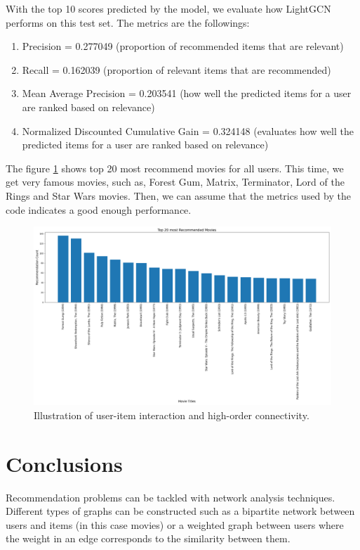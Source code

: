 \documentclass[12pt]{article}
\numberwithin{equation}{section}
\begin{document}
With the top 10 scores predicted by the model, we evaluate how LightGCN performs on this test set. The metrics are the followings:

\begin{enumerate}
	\item Precision = 0.277049 (proportion of recommended items that are relevant)
	\item Recall = 0.162039 (proportion of relevant items that are recommended)
	\item Mean Average Precision = 0.203541 (how well the predicted items for a user are ranked based on relevance)
	\item Normalized Discounted Cumulative Gain = 0.324148 (evaluates how well the predicted items for a user are ranked based on relevance)
\end{enumerate}

The figure \ref{fig:top_20_movies} shows top 20 most recommend movies for all users. This time, we get very famous movies, such as, Forest Gum, Matrix, Terminator, Lord of the Rings and Star Wars movies. Then, we can assume that the metrics used by the code indicates a good enough performance.


\begin{figure}[h]
	\centering
	\includegraphics[width=1\textwidth]{top_20_movies.png}
	\caption{Illustration of user-item interaction and high-order connectivity.}
	\label{fig:top_20_movies}
\end{figure}

\newpage
\section{Conclusions}

Recommendation problems can be tackled with network analysis techniques. Different types of graphs can be constructed such as a bipartite network between users and items (in this case movies) or a weighted graph between users where the weight in an edge corresponds to the similarity between them. 
\end{document}
